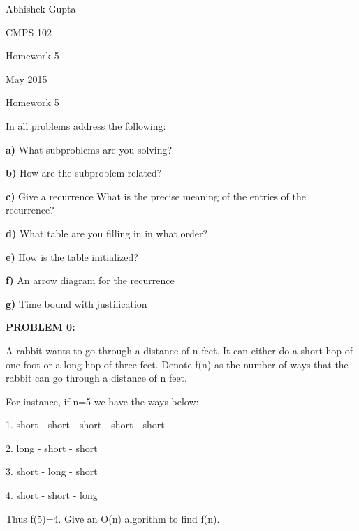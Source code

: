 \documentclass[11pt]{article}
\begin{document}
\noindent Abhishek Gupta

\vspace{2mm}

\noindent CMPS 102

\vspace{2mm}

\noindent Homework 5

\vspace{2mm}

 May 2015

\vspace{2mm}

\centerline{Homework 5}

\vspace{2mm}

\noindent In all problems address the following:

\textbf{a)} What subproblems are you solving?

\textbf{b)} How are the subproblem related?

\textbf{c)} Give a recurrence What is the precise meaning of the entries of the recurrence?

\textbf{d)} What table are you filling in in what order?

\textbf{e)} How is the table initialized?

\textbf{f)} An arrow diagram for the recurrence

\textbf{g)} Time bound with justification

\vspace{2mm}

\noindent \textbf{PROBLEM 0:}

\vspace{2mm}

\noindent A rabbit wants to go through a distance of n feet. It can either do a short hop of one foot or a long hop of three feet. Denote f(n) as the number of ways that the rabbit can go through a distance of n feet. 

\noindent For instance, if n=5 we have the ways below:

1. short - short - short - short - short

2. long - short - short

3. short - long - short  

4. short - short - long

\noindent Thus f(5)=4. Give an O(n) algorithm to find f(n).

\vspace{6mm}
\end{document}
